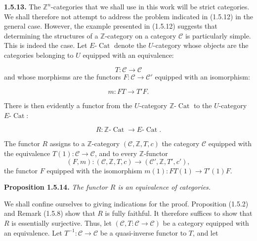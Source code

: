 %
\noindent\textbf{1.5.13.}\quad
The $\mathbb Z^n$-categories that we shall use in this work will be
strict categories. We shall therefore not attempt to address the problem
indicated in (1.5.12) in the general case. However, the example presented
in (1.5.12) suggests that determining the structures of a
$\mathbb Z$-category on a category $\mathcal C$ is particularly simple.
This is indeed the case. Let $E\text{-}\operatorname{Cat}$ denote the
$U$-category whose objects are the categories belonging to $U$ equipped
with an equivalence:

\begin{equation}
  T\colon\mathcal C\longrightarrow\mathcal C
  \tag{1.5.13.1}
\end{equation}
and whose morphisms are the functors
$F\colon\mathcal C\to\mathcal C'$ equipped with an isomorphism:

\begin{equation}
  m\colon FT\longrightarrow T'F.
  \tag{1.5.13.2}
\end{equation}

There is then evidently a functor from the $U$-category
$\mathbb Z\text{-}\operatorname{Cat}$ to the $U$-category
$E\text{-}\operatorname{Cat}$:

\begin{equation}
  R\colon \mathbb Z\text{-}\operatorname{Cat}
  \longrightarrow E\text{-}\operatorname{Cat}.
  \tag{1.5.13.3}
\end{equation}

The functor $R$ assigns to a $\mathbb Z$-category
$(\mathcal C,\mathbb Z,T,c)$ the category $\mathcal C$ equipped with
the equivalence $T(1)\colon\mathcal C\to\mathcal C$, and to every
$\mathbb Z$-functor
\[
  (F,m)\colon(\mathcal C,\mathbb Z,T,c)
  \longrightarrow(\mathcal C',\mathbb Z,T',c'),
\]
the functor $F$ equipped with the isomorphism
$m(1)\colon FT(1)\to T'(1)F$.

\noindent\textbf{Proposition 1.5.14.}\quad
\emph{The functor $R$ is an equivalence of categories.}

We shall confine ourselves to giving indications for the proof.
Proposition (1.5.2) and Remark (1.5.8) show that $R$ is fully faithful.
It therefore suffices to show that $R$ is essentially surjective. Thus,
let $(\mathcal C,T\colon\mathcal C\to\mathcal C)$ be a category
equipped with an equivalence. Let
$T^{-1}\colon\mathcal C\to\mathcal C$ be a quasi-inverse functor to
$T$, and let

